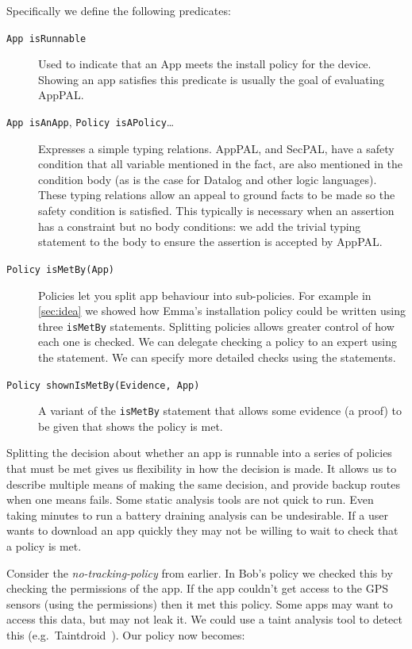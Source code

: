 \documentclass[]{scrartcl}
\begin{document}
Specifically we define the following predicates:
\begin{description}
  \item[\texttt{App isRunnable}]
    Used to indicate that an App meets the install policy for the device.
    Showing an app satisfies this predicate is usually the goal of evaluating AppPAL.

  \item[\texttt{App isAnApp}, \texttt{Policy isAPolicy}\ldots]
    Expresses a simple typing relations.
    AppPAL, and SecPAL, have a safety condition that all variable mentioned in the fact, are also mentioned in the condition body (as is the case for Datalog and other logic languages).
    These typing relations allow an appeal to ground facts to be made so the safety condition is satisfied.
    This typically is necessary when an assertion has a constraint but no body conditions: we add the trivial typing statement to the body to ensure the assertion is accepted by AppPAL.

  \item[\texttt{Policy isMetBy(App)}]
    Policies let you split app behaviour into sub-policies.
    For example in \autoref{sec:idea} we showed how Emma's installation policy could be written using three \texttt{isMetBy} statements.
    Splitting policies allows greater control of how each one is checked.
    We can delegate checking a policy to an expert using the  statement.
    We can specify more detailed checks using the  statements.

  \item[\texttt{Policy shownIsMetBy(Evidence, App)}]
    A variant of the \texttt{isMetBy} statement that allows some evidence (a proof) to be given that shows the policy is met.
\end{description}

Splitting the decision about whether an app is runnable into a series of policies that must be met gives us flexibility in how the decision is made.
It allows us to describe multiple means of making the same decision, and provide backup routes when one means fails.
Some static analysis tools are not quick to run.
Even taking minutes to run a battery draining analysis can be undesirable.
If a user wants to download an app quickly they may not be willing to wait to check that a policy is met.

Consider the \emph{no-tracking-policy} from earlier.
In Bob's policy we checked this by checking the permissions of the app.
If the app couldn't get access to the GPS sensors (using the permissions) then it met this policy.
Some apps may want to access this data, but may not leak it.
We could use a taint analysis tool to detect this (e.g.~Taintdroid~\citep{Fritz:2013vi}).
Our policy now becomes:
\end{document}
